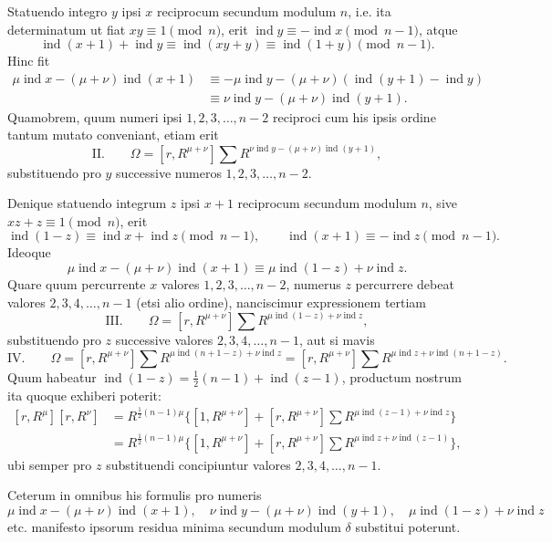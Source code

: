 \documentclass[12pt]{article}
\begin{document}
Statuendo integro $y$ ipsi $x$ reciprocum secundum modulum $n$, i.e. ita determinatum ut fiat $xy\equiv1\pmod n$, erit $\operatorname{ind}y\equiv-\operatorname{ind}x\pmod{n-1}$, atque
\[
\operatorname{ind}(x+1)+\operatorname{ind}y\equiv\operatorname{ind}(xy+y)\equiv \operatorname{ind}(1+y)\pmod{n-1}.
\]
Hinc fit
\[
\begin{aligned}
\mu\operatorname{ind}x-(\mu+\nu)\operatorname{ind}(x+1)
&\equiv-\mu\operatorname{ind}y-(\mu+\nu)(\operatorname{ind}(y+1)-\operatorname{ind}y)\\
&\equiv \nu\operatorname{ind}y-(\mu+\nu)\operatorname{ind}(y+1).
\end{aligned}
\]
Quamobrem, quum numeri ipsi $1,2,3,\ldots,n-2$ reciproci cum his ipsis ordine tantum mutato conveniant, etiam erit
\[
\text{II.}\qquad
\Omega=[r,R^{\mu+\nu}]\sum R^{\nu\operatorname{ind}y-(\mu+\nu)\operatorname{ind}(y+1)},
\]
substituendo pro $y$ successive numeros $1,2,3,\ldots,n-2$.

Denique statuendo integrum $z$ ipsi $x+1$ reciprocum secundum modulum $n$, sive $xz+z\equiv1\pmod n$, erit
\[
\operatorname{ind}(1-z)\equiv\operatorname{ind}x+\operatorname{ind}z\pmod{n-1},\qquad
\operatorname{ind}(x+1)\equiv-\operatorname{ind}z\pmod{n-1}.
\]
Ideoque
\[
\mu\operatorname{ind}x-(\mu+\nu)\operatorname{ind}(x+1)
\equiv \mu\operatorname{ind}(1-z)+\nu\operatorname{ind}z.
\]
Quare quum percurrente $x$ valores $1,2,3,\ldots,n-2$, numerus $z$ percurrere debeat valores $2,3,4,\ldots,n-1$ (etsi alio ordine), nanciscimur expressionem tertiam
\[
\text{III.}\qquad
\Omega=[r,R^{\mu+\nu}]\sum R^{\mu\operatorname{ind}(1-z)+\nu\operatorname{ind}z},
\]
substituendo pro $z$ successive valores $2,3,4,\ldots,n-1$, aut si mavis
\[
\text{IV.}\qquad
\Omega=[r,R^{\mu+\nu}]\sum R^{\mu\operatorname{ind}(n+1-z)+\nu\operatorname{ind}z}
=[r,R^{\mu+\nu}]\sum R^{\mu\operatorname{ind}z+\nu\operatorname{ind}(n+1-z)}.
\]
Quum habeatur $\operatorname{ind}(1-z)=\frac12(n-1)+\operatorname{ind}(z-1)$, productum nostrum ita quoque exhiberi poterit:
\[
\begin{aligned}
[r,R^\mu][r,R^\nu]&=R^{\frac12(n-1)\mu}\{[1,R^{\mu+\nu}]
+[r,R^{\mu+\nu}]\sum R^{\mu\operatorname{ind}(z-1)+\nu\operatorname{ind}z}\}\\
&=R^{\frac12(n-1)\mu}\{[1,R^{\mu+\nu}]
+[r,R^{\mu+\nu}]\sum R^{\mu\operatorname{ind}z+\nu\operatorname{ind}(z-1)}\},
\end{aligned}
\]
ubi semper pro $z$ substituendi concipiuntur valores $2,3,4,\ldots,n-1$.

Ceterum in omnibus his formulis pro numeris
\[
\mu\operatorname{ind}x-(\mu+\nu)\operatorname{ind}(x+1),\quad
\nu\operatorname{ind}y-(\mu+\nu)\operatorname{ind}(y+1),\quad
\mu\operatorname{ind}(1-z)+\nu\operatorname{ind}z
\]
etc. manifesto ipsorum residua minima secundum modulum $\delta$ substitui poterunt.
\end{document}

